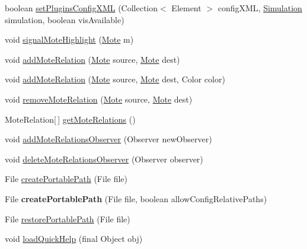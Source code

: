 \begin{DoxyCompactItemize}
\item 
boolean \hyperlink{classorg_1_1contikios_1_1cooja_1_1Cooja_a533cf5b29d99909c3d5006410c50fcb3}{set\-Plugins\-Config\-X\-M\-L} (Collection$<$ Element $>$ config\-X\-M\-L, \hyperlink{classorg_1_1contikios_1_1cooja_1_1Simulation}{Simulation} simulation, boolean vis\-Available)
\item 
void \hyperlink{classorg_1_1contikios_1_1cooja_1_1Cooja_a33b977afa99c51bca0d2e804dfdd7ae1}{signal\-Mote\-Highlight} (\hyperlink{interfaceorg_1_1contikios_1_1cooja_1_1Mote}{Mote} m)
\item 
void \hyperlink{classorg_1_1contikios_1_1cooja_1_1Cooja_a39222d48cee0ec990dc9da2299c86273}{add\-Mote\-Relation} (\hyperlink{interfaceorg_1_1contikios_1_1cooja_1_1Mote}{Mote} source, \hyperlink{interfaceorg_1_1contikios_1_1cooja_1_1Mote}{Mote} dest)
\item 
void \hyperlink{classorg_1_1contikios_1_1cooja_1_1Cooja_afe30c2420481ee2c072d80346400c26e}{add\-Mote\-Relation} (\hyperlink{interfaceorg_1_1contikios_1_1cooja_1_1Mote}{Mote} source, \hyperlink{interfaceorg_1_1contikios_1_1cooja_1_1Mote}{Mote} dest, Color color)
\item 
void \hyperlink{classorg_1_1contikios_1_1cooja_1_1Cooja_adada775b6f36d1ee04b6ed97a8dc47ae}{remove\-Mote\-Relation} (\hyperlink{interfaceorg_1_1contikios_1_1cooja_1_1Mote}{Mote} source, \hyperlink{interfaceorg_1_1contikios_1_1cooja_1_1Mote}{Mote} dest)
\item 
Mote\-Relation\mbox{[}$\,$\mbox{]} \hyperlink{classorg_1_1contikios_1_1cooja_1_1Cooja_a7e42921b36012ba1f1056dbe5f1ffd04}{get\-Mote\-Relations} ()
\item 
void \hyperlink{classorg_1_1contikios_1_1cooja_1_1Cooja_a05178a0132e5acb0fbaf4f977094f46a}{add\-Mote\-Relations\-Observer} (Observer new\-Observer)
\item 
void \hyperlink{classorg_1_1contikios_1_1cooja_1_1Cooja_a57c8d4bee332f78c569f300b4ae937af}{delete\-Mote\-Relations\-Observer} (Observer observer)
\item 
File \hyperlink{classorg_1_1contikios_1_1cooja_1_1Cooja_aa6686d07c6bb986aed0920b49f954668}{create\-Portable\-Path} (File file)
\item 
\hypertarget{classorg_1_1contikios_1_1cooja_1_1Cooja_aacc90a0ccf8ecb1ff4f1318dd67f5d19}{File {\bfseries create\-Portable\-Path} (File file, boolean allow\-Config\-Relative\-Paths)}\label{classorg_1_1contikios_1_1cooja_1_1Cooja_aacc90a0ccf8ecb1ff4f1318dd67f5d19}

\item 
File \hyperlink{classorg_1_1contikios_1_1cooja_1_1Cooja_ae9e9345b095540569f17ec21edbd75f7}{restore\-Portable\-Path} (File file)
\item 
void \hyperlink{classorg_1_1contikios_1_1cooja_1_1Cooja_a835145d317bdb9fbbef855296df4d65e}{load\-Quick\-Help} (final Object obj)
\end{DoxyCompactItemize}
